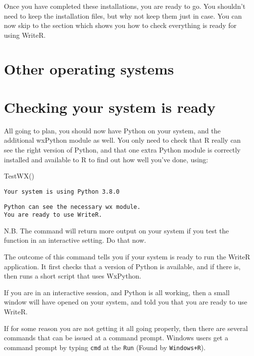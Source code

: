 \documentclass[
]{book}
\newenvironment{Shaded}{\begin{snugshade}}{\end{snugshade}}
\newcommand{\FunctionTok}[1]{\textcolor[rgb]{0.00,0.00,0.00}{#1}}
\newcommand{\NormalTok}[1]{#1}
\begin{document}
Once you have completed these installations, you are ready to go. You shouldn't need to keep the installation files, but why not keep them just in case.
You can now skip to the section which shows you how to check everything is ready for using WriteR.

\hypertarget{other-operating-systems}{%
\section{Other operating systems}\label{other-operating-systems}}

\hypertarget{checking-your-system-is-ready}{%
\section{Checking your system is ready}\label{checking-your-system-is-ready}}

All going to plan, you should now have Python on your system, and the additional wxPython module as well. You only need to check that R really can see the right version of Python, and that one extra Python module is correctly installed and available to R to find out how well you've done, using:

\begin{Shaded}
\begin{Highlighting}[]
\FunctionTok{TestWX}\NormalTok{()}
\end{Highlighting}
\end{Shaded}

\begin{verbatim}
Your system is using Python 3.8.0
\end{verbatim}

\begin{verbatim}
Python can see the necessary wx module.
You are ready to use WriteR.
\end{verbatim}

N.B. The command will return more output on your system if you test the function in an interactive setting. Do that now.

The outcome of this command tells you if your system is ready to run the WriteR application. It first checks that a version of Python is available, and if there is, then runs a short script that uses WxPython.

If you are in an interactive session, and Python is all working, then a small window will have opened on your system, and told you that you are ready to use WriteR.

If for some reason you are not getting it all going properly, then there are several commands that can be issued at a command prompt. Windows users get a command prompt by typing \texttt{cmd} at the \texttt{Run} (Found by \texttt{Windows+R}).
\end{document}
